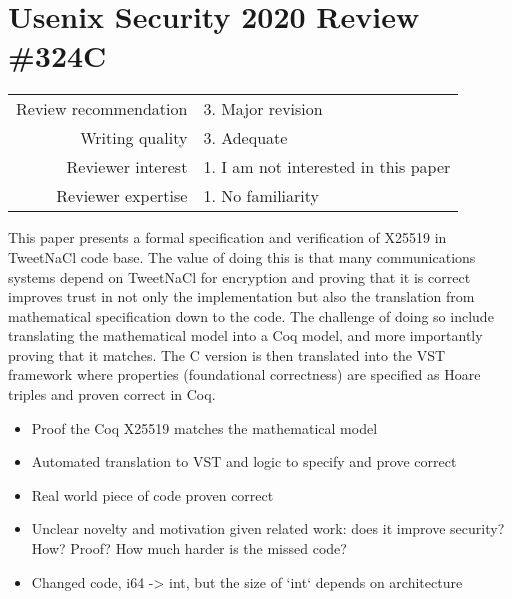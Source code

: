 \newpage
\section{Usenix Security 2020 Review \#324C}

\begin{tabular}{rl}
    \toprule
    Review recommendation & 3. Major revision                    \\
    Writing quality       & 3. Adequate                          \\
    Reviewer interest     & 1. I am not interested in this paper \\
    Reviewer expertise    & 1. No familiarity                    \\
    \bottomrule
\end{tabular}

\begin{center}
\end{center}

This paper presents a formal specification and verification of X25519 in TweetNaCl code base. The value of doing this is that many communications systems depend on TweetNaCl for encryption and proving that it is correct improves trust in not only the implementation but also the translation from mathematical specification down to the code. The challenge of doing so include translating the mathematical model into a Coq model, and more importantly proving that it matches. The C version is then translated into the VST framework where properties (foundational correctness) are specified as Hoare triples and proven correct in Coq.

\begin{center}
\end{center}

\begin{itemize}
    \item Proof the Coq X25519 matches the mathematical model
    \item Automated translation to VST and logic to specify and prove correct
    \item Real world piece of code proven correct
\end{itemize}

\begin{center}
\end{center}

\begin{itemize}
    \item Unclear novelty and motivation given related work: does it improve security? How? Proof? How much harder is the missed code?
    \item Changed code, i64 -> int, but the size of `int` depends on architecture
\end{itemize}

